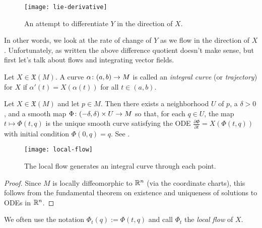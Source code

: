 \begin{figure}[htbp]
	\centering
		\texttt{[image: lie-derivative]}
	\caption{An attempt to differentiate $Y$ in the direction of $X$.}
	\label{fig:lie-derivative}
\end{figure}

In other words, we look at the rate of change of $Y$ as we flow in the direction of $X$. Unfortunately, as written the above difference quotient doesn't make sense, but first let's talk about flows and integrating vector fields.

\begin{definition}\label{def:integral curve}
	Let $X \in \mathfrak{X}(M)$. A curve $\alpha\colon\thinspace\! (a,b) \to M$ is called an \emph{integral curve} (or \emph{trajectory}) for $X$ if $\alpha'(t) = X(\alpha(t))$ for all $t \in (a,b)$. 
\end{definition}

\begin{proposition}\label{prop:local flow}
	Let $X \in \mathfrak{X}(M)$ and let $p \in M$. Then there exists a neighborhood $U$ of $p$, a $\delta > 0$, and a smooth map $\Phi\colon\thinspace\! (-\delta, \delta) \times U \to M$ so that, for each $q \in U$, the map $t \mapsto \Phi(t,q)$ is the unique smooth curve satisfying the ODE $\frac{\partial \Phi}{\partial t} = X(\Phi(t,q))$ with initial condition $\Phi(0,q) = q$. See .
\end{proposition}

\begin{figure}[htbp]
	\centering
		\texttt{[image: local-flow]}
	\caption{The local flow generates an integral curve through each point.}
	\label{fig:local-flow}
\end{figure}

\begin{proof}
	Since $M$ is locally diffeomorphic to $\mathbb{R}^n$ (via the coordinate charts), this follows from the fundamental theorem on existence and uniqueness of solutions to ODEs in $\mathbb{R}^n$.
\end{proof}

We often use the notation $\Phi_t(q):=\Phi(t,q)$ and call $\Phi_t$ the \emph{local flow} of $X$.

